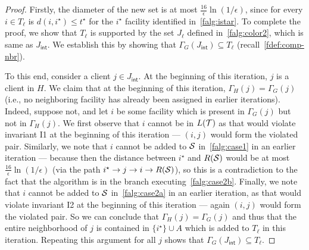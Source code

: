 \begin{proof}
Firstly, the diameter of the new set is at most $\frac{16}{\epsilon}\ln(1/\epsilon)$, since for every $i \in T_\ell$ is $d(i,i^\star) \leq t^\star$ for the  $i^\star$ facility identified in~\cref{falg:istar}. To complete the proof, we show that $T_\ell$ is supported by the set $J_\ell$ defined in~\cref{falg:color2}, which is same as $J_\mathsf{int}$. %
We establish this by showing that $\Gamma_G(J_\mathsf{int}) \subseteq T_\ell$ (recall~\cref{fdef:comp-nbr}).

To this end, consider a client $j \in J_\mathsf{int}$. At the beginning of this iteration, $j$ is a client  in $H$.
We claim that at the beginning of this iteration, $\Gamma_H(j) = \Gamma_G(j)$ (i.e., no neighboring facility has already been assigned in earlier iterations). Indeed, suppose not, and let $i$ be some facility which is present in $\Gamma_G(j)$ but not in $\Gamma_H(j)$. We first observe that $i$ cannot be in $L({\cal T})$ as that would violate invariant I1 at the beginning of this iteration --- $(i,j)$ would form the violated pair. Similarly, we note that $i$ cannot be added to ${\cal S}$ in~\cref{falg:case1} in an earlier iteration --- because then the distance between $i^\star$ and $R({\cal S})$ would be at most $\frac{16}{\epsilon}\ln(1/\epsilon)$ (via the path $i^\star \rightarrow j \rightarrow i \rightarrow R({\cal S})$), so this is a contradiction to the fact that the algorithm is in the branch executing~\cref{falg:case2b}. Finally, we note that $i$ cannot be added to ${\cal S}$ in~\cref{falg:case2a} in an earlier iteration, as that would violate invariant I2 at the beginning of this iteration --- again $(i,j)$ would form the violated pair.
So we can conclude that $\Gamma_H(j) = \Gamma_G(j)$ and thus that the entire neighborhood of $j$ is contained in $\{i^\star\} \cup A$ which is added to $T_\ell$ in this iteration. Repeating this argument for all $j$ shows that $\Gamma_G(J_\mathsf{int}) \subseteq T_\ell$.
\end{proof}

